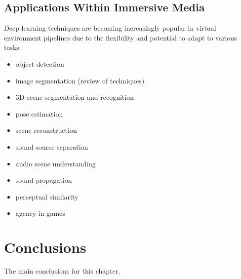 \subsection{Applications Within Immersive Media}
Deep learning techniques are becoming increasingly popular in virtual environment pipelines due to the flexibility and potential to adapt to various tasks. 
\begin{itemize}
    \item object detection \cite{szeliski2022computer, Redmon_2016_CVPR}
    \item image segmentation \cite{minae_segmentation} (review of techniques)
    \item 3D scene segmentation and recognition \cite{kalogerakis20173d}
    \item pose estimation \cite{andriluka20142d}
    \item scene reconstruction \cite{patow2003survey}
    \item sound source separation \cite{virtanen2006sound}
    \item audio scene understanding \cite{abesser2020review}
    \item sound propagation \cite{liu2022sound}
    \item perceptual similarity \cite{Dolhasz_2020_CVPR}
    \item agency in games \cite{yannakakis2018artificial}
\end{itemize}


 

\section{Conclusions}

The main conclusions for this chapter.


